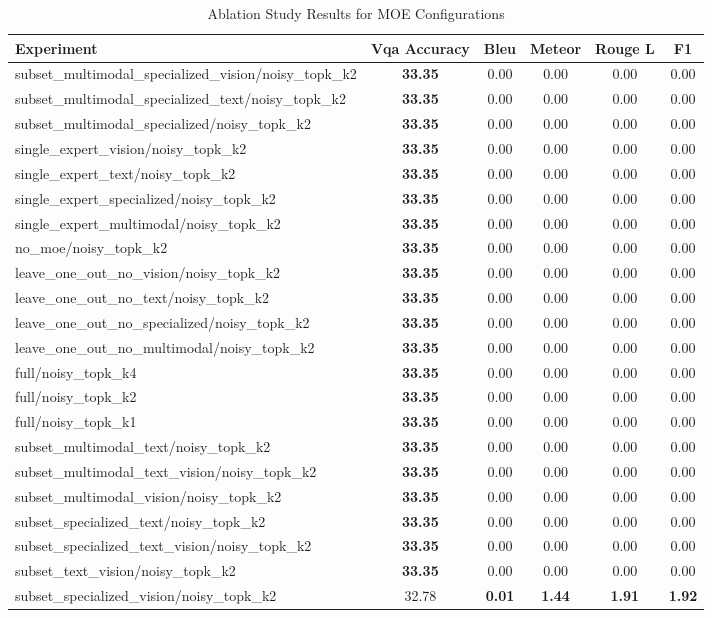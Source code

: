 \begin{table}[h]
\centering
\caption{Ablation Study Results for MOE Configurations}
\label{tab:ablation}
\begin{tabular}{lccccc}
\toprule
Experiment & Vqa Accuracy & Bleu & Meteor & Rouge L & F1 \\
\midrule
subset\_multimodal\_specialized\_vision/noisy\_topk\_k2 & \textbf{33.35} & 0.00 & 0.00 & 0.00 & 0.00 \\
subset\_multimodal\_specialized\_text/noisy\_topk\_k2 & \textbf{33.35} & 0.00 & 0.00 & 0.00 & 0.00 \\
subset\_multimodal\_specialized/noisy\_topk\_k2 & \textbf{33.35} & 0.00 & 0.00 & 0.00 & 0.00 \\
single\_expert\_vision/noisy\_topk\_k2 & \textbf{33.35} & 0.00 & 0.00 & 0.00 & 0.00 \\
single\_expert\_text/noisy\_topk\_k2 & \textbf{33.35} & 0.00 & 0.00 & 0.00 & 0.00 \\
single\_expert\_specialized/noisy\_topk\_k2 & \textbf{33.35} & 0.00 & 0.00 & 0.00 & 0.00 \\
single\_expert\_multimodal/noisy\_topk\_k2 & \textbf{33.35} & 0.00 & 0.00 & 0.00 & 0.00 \\
no\_moe/noisy\_topk\_k2 & \textbf{33.35} & 0.00 & 0.00 & 0.00 & 0.00 \\
leave\_one\_out\_no\_vision/noisy\_topk\_k2 & \textbf{33.35} & 0.00 & 0.00 & 0.00 & 0.00 \\
leave\_one\_out\_no\_text/noisy\_topk\_k2 & \textbf{33.35} & 0.00 & 0.00 & 0.00 & 0.00 \\
leave\_one\_out\_no\_specialized/noisy\_topk\_k2 & \textbf{33.35} & 0.00 & 0.00 & 0.00 & 0.00 \\
leave\_one\_out\_no\_multimodal/noisy\_topk\_k2 & \textbf{33.35} & 0.00 & 0.00 & 0.00 & 0.00 \\
full/noisy\_topk\_k4 & \textbf{33.35} & 0.00 & 0.00 & 0.00 & 0.00 \\
full/noisy\_topk\_k2 & \textbf{33.35} & 0.00 & 0.00 & 0.00 & 0.00 \\
full/noisy\_topk\_k1 & \textbf{33.35} & 0.00 & 0.00 & 0.00 & 0.00 \\
subset\_multimodal\_text/noisy\_topk\_k2 & \textbf{33.35} & 0.00 & 0.00 & 0.00 & 0.00 \\
subset\_multimodal\_text\_vision/noisy\_topk\_k2 & \textbf{33.35} & 0.00 & 0.00 & 0.00 & 0.00 \\
subset\_multimodal\_vision/noisy\_topk\_k2 & \textbf{33.35} & 0.00 & 0.00 & 0.00 & 0.00 \\
subset\_specialized\_text/noisy\_topk\_k2 & \textbf{33.35} & 0.00 & 0.00 & 0.00 & 0.00 \\
subset\_specialized\_text\_vision/noisy\_topk\_k2 & \textbf{33.35} & 0.00 & 0.00 & 0.00 & 0.00 \\
subset\_text\_vision/noisy\_topk\_k2 & \textbf{33.35} & 0.00 & 0.00 & 0.00 & 0.00 \\
subset\_specialized\_vision/noisy\_topk\_k2 & 32.78 & \textbf{0.01} & \textbf{1.44} & \textbf{1.91} & \textbf{1.92} \\
\bottomrule
\end{tabular}
\end{table}